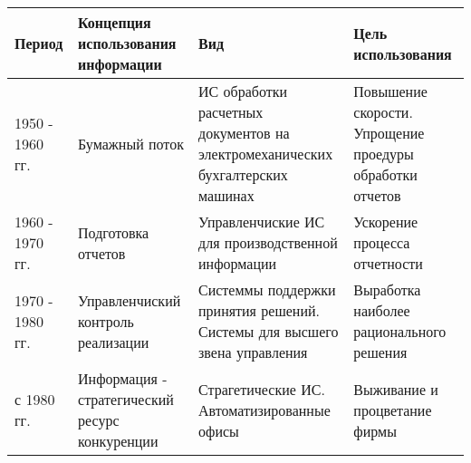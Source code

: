 \documentclass[8pt]{article}
\begin{document}

\begin{landscape}
\centering
\begin{tabular}{ p{3cm} | p{5cm}|p{5cm}|p{5cm}}
\hline
Период & Концепция использования информации&Вид &Цель использования \\
\hline
1950 - 1960 гг.& Бумажный поток & ИС обработки расчетных документов на электромеханических бухгалтерских машинах & Повышение скорости. Упрощение проедуры обработки отчетов\\
1960 - 1970 гг.& Подготовка отчетов& Управленчиские ИС для производственной информации & Ускорение процесса отчетности\\
1970 - 1980 гг.& Управленчиский контроль реализации& Системмы поддержки принятия решений. Системы для высшего звена управления & Выработка наиболее рационального решения\\
с 1980 гг.& Информация - стратегический ресурс конкуренции & Страгетические ИС. Автоматизированные офисы & Выживание и процветание фирмы\\
\end{tabular}
\end{landscape}
\end{document}
